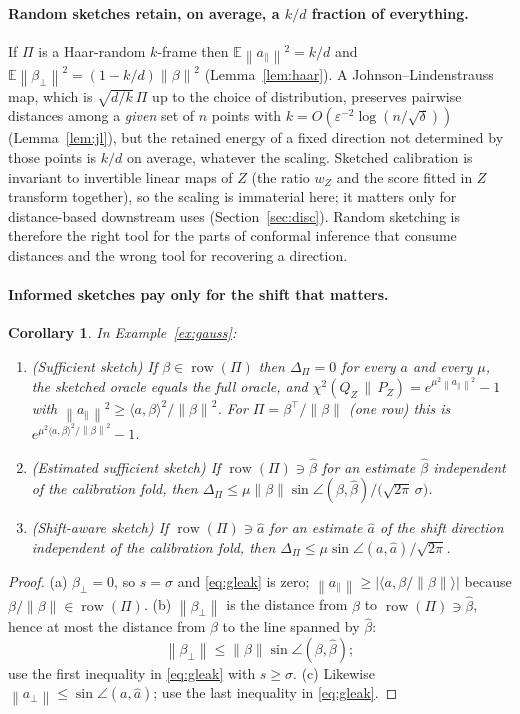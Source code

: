 \documentclass[11pt,a4paper]{article}
\newcommand{\chisqZ}{\chi^2(Q_Z\,\|\,P_Z)}
\newcommand{\norm}[1]{\left\|#1\right\|}
\newcommand{\E}{\mathbb{E}}
\theoremstyle{plain}
\newtheorem{corollary}[theorem]{Corollary}
\theoremstyle{definition}
\theoremstyle{remark}
\begin{document}
\paragraph{Random sketches retain, on average, a $k/d$ fraction of everything.} If $\Pi$ is a Haar-random $k$-frame then $\E\norm{a_\parallel}^2=k/d$ and $\E\norm{\beta_\perp}^2=(1-k/d)\norm\beta^2$ (Lemma~\ref{lem:haar}). A Johnson--Lindenstrauss map, which is $\sqrt{d/k}\,\Pi$ up to the choice of distribution, preserves pairwise distances among a \emph{given} set of $n$ points with $k=O(\varepsilon^{-2}\log(n/\sqrt\delta))$ (Lemma~\ref{lem:jl}), but the retained energy of a fixed direction not determined by those points is $k/d$ on average, whatever the scaling. Sketched calibration is invariant to invertible linear maps of $Z$ (the ratio $w_Z$ and the score fitted in $Z$ transform together), so the scaling is immaterial here; it matters only for distance-based downstream uses (Section~\ref{sec:disc}). Random sketching is therefore the right tool for the parts of conformal inference that consume distances and the wrong tool for recovering a direction.

\paragraph{Informed sketches pay only for the shift that matters.}
\begin{corollary}\label{cor:informed}
In Example~\ref{ex:gauss}:
\begin{enumerate}[leftmargin=1.8em,itemsep=1pt]
\item[(a)] (Sufficient sketch) If $\beta\in\operatorname{row}(\Pi)$ then $\Delta_\Pi=0$ for every $a$ and every $\mu$, the sketched oracle equals the full oracle, and $\chisqZ=e^{\mu^2\norm{a_\parallel}^2}-1$ with $\norm{a_\parallel}^2\ge\langle a,\beta\rangle^2/\norm\beta^2$. For $\Pi=\beta^{\!\top}/\norm\beta$ (one row) this is $e^{\mu^2\langle a,\beta\rangle^2/\norm\beta^2}-1$.
\item[(b)] (Estimated sufficient sketch) If $\operatorname{row}(\Pi)\ni\hat\beta$ for an estimate $\hat\beta$ independent of the calibration fold, then
$\Delta_\Pi\le\mu\norm\beta\sin\angle(\beta,\hat\beta)\big/\bigl(\sqrt{2\pi}\,\sigma\bigr)$.
\item[(c)] (Shift-aware sketch) If $\operatorname{row}(\Pi)\ni\hat a$ for an estimate $\hat a$ of the shift direction independent of the calibration fold, then
$\Delta_\Pi\le\mu\sin\angle(a,\hat a)/\sqrt{2\pi}$.
\end{enumerate}
\end{corollary}
\begin{proof}
(a) $\beta_\perp=0$, so $s=\sigma$ and \eqref{eq:gleak} is zero; $\norm{a_\parallel}\ge|\langle a,\beta/\norm\beta\rangle|$ because $\beta/\norm\beta\in\operatorname{row}(\Pi)$. (b) $\norm{\beta_\perp}$ is the distance from $\beta$ to $\operatorname{row}(\Pi)\ni\hat\beta$, hence at most the distance from $\beta$ to the line spanned by $\hat\beta$:
\[
\norm{\beta_\perp}\le\norm\beta\sin\angle(\beta,\hat\beta);
\]
use the first inequality in \eqref{eq:gleak} with $s\ge\sigma$. (c) Likewise $\norm{a_\perp}\le\sin\angle(a,\hat a)$; use the last inequality in \eqref{eq:gleak}.
\end{proof}
\end{document}
